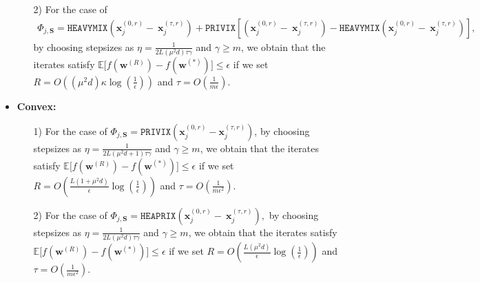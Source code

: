 \begin{theorem}
\begin{itemize}
\begin{itemize}
          \item[2)] For the case of 
         \begin{align}
    \Phi_{j,\mathbf{S}}=\texttt{HEAVYMIX}\left(\boldsymbol{x}_j^{(0,r)}-~{\boldsymbol{x}}_{j}^{(\tau,r)}\right)+\texttt{PRIVIX}\left[\left(\boldsymbol{x}_j^{(0,r)}-~{\boldsymbol{x}}_{j}^{(\tau,r)}\right)-\texttt{HEAVYMIX}\left(\boldsymbol{x}_j^{(0,r)}-~{\boldsymbol{x}}_{j}^{(\tau,r)}\right)\right],
\end{align}
by choosing stepsizes as $\eta=\frac{1}{2L\left(\mu^2d\right)\tau\gamma}$ and $\gamma\geq m$, we obtain that the iterates satisfy $\mathbb{E}\Big[f({\boldsymbol{w}}^{(R)})-f({\boldsymbol{w}}^{(*)})\Big]\leq \epsilon$ if  we set
     $R=O\left(\left(\mu^2d\right)\kappa\log\left(\frac{1}{\epsilon}\right)\right)$ and $ \tau=O\left(\frac{1}{m\epsilon}\right)$. 
      \end{itemize}
      
     \item \textbf{Convex:}
     \begin{itemize}
         \item[1)]For the case of $\Phi_{j,\mathbf{S}}=\texttt{PRIVIX}\left(\boldsymbol{x}_j^{(0,r)}-\boldsymbol{x}_j^{(\tau,r)}\right)$, by choosing stepsizes as $\eta=\frac{1}{2L\left(\mu^2d+1\right)\tau\gamma}$ and $\gamma\geq m$, we obtain that the iterates satisfy $ \mathbb{E}\Big[f({\boldsymbol{w}}^{(R)})-f({\boldsymbol{w}}^{(*)})\Big]\leq \epsilon$ if we set
     $R=O\left(\frac{L\left(1+\mu^2d\right)}{\epsilon}\log\left(\frac{1}{\epsilon}\right)\right)$ and $ \tau=O\left(\frac{1}{m\epsilon^2}\right).$
         \item[2)] For the case of 
         $
    \Phi_{j,\mathbf{S}}=\texttt{HEAPRIX}\left(\boldsymbol{x}_j^{(0,r)}-~{\boldsymbol{x}}_{j}^{(\tau,r)}\right),$
by choosing stepsizes as $\eta=\frac{1}{2L\left(\mu^2d\right)\tau\gamma}$ and $\gamma\geq m$, we obtain that the iterates satisfy $ \mathbb{E}\Big[f({\boldsymbol{w}}^{(R)})-f({\boldsymbol{w}}^{(*)})\Big]\leq \epsilon$ if we set
     $R=O\left(\frac{L\left(\mu^2d\right)}{\epsilon}\log\left(\frac{1}{\epsilon}\right)\right)$ and $ \tau=O\left(\frac{1}{m\epsilon^2}\right).$ 
     \end{itemize}
 \end{itemize}
\end{theorem}







